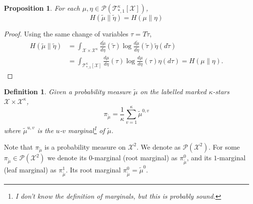 \documentclass[12pt]{article}
\newtheorem{proposition}[theorem]{Proposition}
\newtheorem{definition}[theorem]{Definition}
\numberwithin{equation}{section}
\begin{document}
\begin{proposition}\label{Prp.XY-tilde-RE-eq}
    For each $\mu, \eta \in \mathcal{P}(\mathcal{T}^\kappa_{*, 1}[\mathcal{X}])$,
    \begin{equation}
        H(\widetilde{\mu} \| \widetilde{\eta}) = H(\mu \| \eta)
    \end{equation}
\end{proposition}

\begin{proof}
    Using the same change of variables $\tau = T\widetilde{\tau}$,
    \begin{align*}
        H(\widetilde{\mu} \| \widetilde{\eta}) & = \int_{\mathcal{X}\times\mathcal{X}^\kappa} \frac{d\widetilde{\mu}}{d\widetilde{\eta}}(\widetilde{\tau})\log \frac{d\widetilde{\mu}}{d\widetilde{\eta}}(\widetilde{\tau})\widetilde{\eta}(d\widetilde{\tau}) \\
                                               & = \int_{\mathcal{T}^\kappa_{*, 1}[\mathcal{X}]} \frac{d{\mu}}{d{\eta}}(\tau)\log \frac{d{\mu}}{d{\eta}}(\tau)\eta(d\tau) = H(\mu \| \eta).
    \end{align*}
\end{proof}

\begin{definition}
    Given a probability measure $\widetilde{\mu}$ on the labelled marked $\kappa$-stars $\mathcal{X}\times\mathcal{X}^\kappa$,
    \begin{equation}\label{Eq.XY-pi-tilde-def}
        \pi_{\widetilde{\mu}} = \frac1\kappa \sum_{v=1}^\kappa \widetilde{\mu}^{0, v}
    \end{equation}
    where $\widetilde{\mu}^{u, v}$ is the $u$-$v$ marginal\footnote{I don't know the definition of marginals, but this is probably sound.}
    of $\widetilde{\mu}$.
\end{definition}

Note that $\pi_{\widetilde{\mu}}$ is a probability measure on $\mathcal{X}^2$. We denote as $\mathcal{P}(\mathcal{X}^2)$.
For some $\pi_{\widetilde{\mu}}\in\mathcal{P}(\mathcal{X}^2)$ we denote its $0$-marginal (root marginal) as $\pi_{\widetilde{\mu}}^0$,
and its $1$-marginal (leaf marginal) as $\pi_{\widetilde{\mu}}^1$. Its root marginal $\pi_{\widetilde{\mu}}^0 = \widetilde{\mu}^0$.

\end{document}
